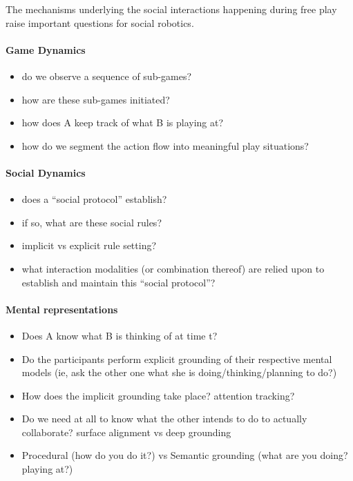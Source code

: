 \documentclass[sigconf]{acmart}
\begin{document}
The mechanisms underlying the social interactions happening during free play
raise important questions for social robotics.


\paragraph{Game Dynamics}

\begin{itemize}
    \item do we observe a sequence of sub-games?
    \item how are these sub-games initiated?
    \item how does A keep track of what B is playing at?
    \item how do we segment the action flow into meaningful play situations?
\end{itemize}

\paragraph{Social Dynamics}

\begin{itemize}
    \item does a ``social protocol'' establish?
    \item if so, what are these social rules?
    \item implicit vs explicit rule setting?
    \item what interaction modalities (or combination thereof) are relied upon
        to establish and maintain this ``social protocol''?
\end{itemize}

\paragraph{Mental representations}

\begin{itemize}
    \item Does A know what B is thinking of at time t?
    \item Do the participants perform explicit grounding of their respective mental models
        (ie, ask the other one what she is doing/thinking/planning to do?)
    \item How does the implicit grounding take place? attention tracking?
    \item Do we need at all to know what the other intends to do to actually
        collaborate? surface alignment vs deep grounding
    \item Procedural (how do you do it?) vs Semantic
        grounding (what are you doing? playing at?)
\end{itemize}
\end{document}

